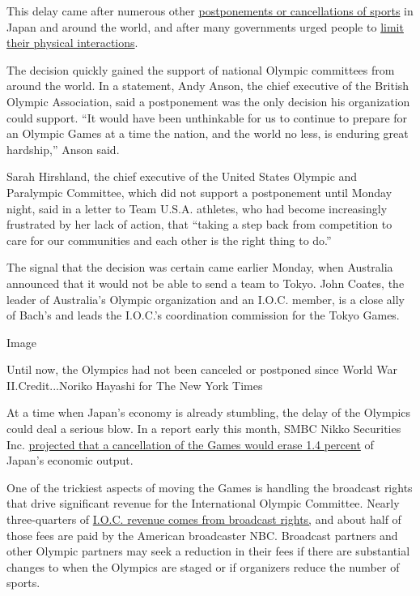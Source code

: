 This delay came after numerous other
\href{https://www.nytimes3xbfgragh.onion/2020/03/12/sports/coronavirus-sports-canceled.html?searchResultPosition=4}{postponements
or cancellations of sports} in Japan and around the world, and after
many governments urged people to
\href{https://www.nytimes3xbfgragh.onion/2020/03/23/well/family/coronavirus-loneliness-isolation-social-distancing-elderly.html}{limit
their physical interactions}.

The decision quickly gained the support of national Olympic committees
from around the world. In a statement, Andy Anson, the chief executive
of the British Olympic Association, said a postponement was the only
decision his organization could support. ``It would have been
unthinkable for us to continue to prepare for an Olympic Games at a time
the nation, and the world no less, is enduring great hardship,'' Anson
said.

Sarah Hirshland, the chief executive of the United States Olympic and
Paralympic Committee, which did not support a postponement until Monday
night, said in a letter to Team U.S.A. athletes, who had become
increasingly frustrated by her lack of action, that ``taking a step back
from competition to care for our communities and each other is the right
thing to do.''

The signal that the decision was certain came earlier Monday, when
Australia announced that it would not be able to send a team to Tokyo.
John Coates, the leader of Australia's Olympic organization and an
I.O.C. member, is a close ally of Bach's and leads the I.O.C.'s
coordination commission for the Tokyo Games.

Image

Until now, the Olympics had not been canceled or postponed since World
War II.Credit...Noriko Hayashi for The New York Times

At a time when Japan's economy is already stumbling, the delay of the
Olympics could deal a serious blow. In a report early this month, SMBC
Nikko Securities Inc.
\href{https://www.japantimes.co.jp/news/2020/03/07/business/economy-business/canceling-tokyo-olympics-gdp/\#.XnkU59NKiYU}{projected
that a cancellation of the Games would erase 1.4 percent} of Japan's
economic output.

One of the trickiest aspects of moving the Games is handling the
broadcast rights that drive significant revenue for the International
Olympic Committee. Nearly three-quarters of
\href{https://stillmed.olympic.org/media/Document\%20Library/OlympicOrg/Documents/IOC-Marketing-and-Broadcasting-General-Files/Olympic-Marketing-Fact-File-2018.pdf}{I.O.C.
revenue comes from broadcast rights,} and about half of those fees are
paid by the American broadcaster NBC. Broadcast partners and other
Olympic partners may seek a reduction in their fees if there are
substantial changes to when the Olympics are staged or if organizers
reduce the number of sports.

